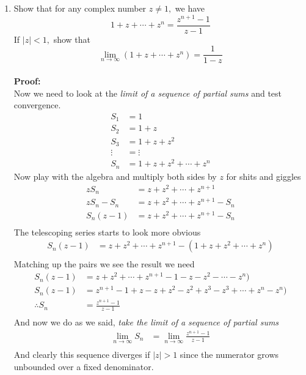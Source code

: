 \begin{enumerate}
	\item Show that for any complex number $z \neq 1,$ we have
	\[ 1 + z + \cdots + z^n = \frac{z^{n + 1} - 1}{z - 1}\]
	If $|z| < 1,$ show that
	\[ \lim_{n \to \infty} (1 + z + \cdots + z^n ) = \frac{1}{1 - z} \] \\
		
	\textbf{Proof:} \\
	Now we need to look at the \textit{limit of a sequence of partial sums} and test convergence. \\

	\begin{align*}
		S_1 &= 1 \\
		S_2 &= 1 + z \\
		S_3 &= 1 + z + z^2 \\
		\vdots &= \vdots \\
		S_n &= 1 + z + z^2 + \cdots + z^n
	\end{align*}
	Now play with the algebra and multiply both sides by $z$ for shits and giggles
	\begin{align*}
		zS_n &= z + z^2 + \cdots + z^{n +1} \\
		zS_n - S_n &= z + z^2 + \cdots + z^{n +1} - S_n \\
		S_n(z - 1) &= z + z^2 + \cdots + z^{n +1} - S_n \\
	\end{align*}
	The telescoping series starts to look more obvious
	\begin{align*}
		S_n(z - 1) &= z + z^2 + \cdots + z^{n +1} - (1 + z + z^2 + \cdots + z^n) \\
	\end{align*}
	Matching up the pairs we see the result we need
	\begin{align*}
		S_n(z - 1) &= z + z^2 + \cdots + z^{n +1} - 1 - z - z^2 - \cdots - z^n) \\
		S_n(z - 1) &= z^{n +1} - 1 + z - z + z^2 - z^2 + z^3 - z^3 + \cdots + z^n - z^n) \\
		\therefore S_n &= \frac{z^{n +1} - 1}{z - 1} \\
	\end{align*}
	And now we do as we said, \textit{take the limit of a sequence of partial sums}
	\begin{align*}
		\lim_{n \to \infty} S_n &= \lim_{n \to \infty} \frac{z^{n +1} - 1}{z - 1} \\
	\end{align*}
	And clearly this sequence diverges if $|z| > 1$ since the numerator grows unbounded over a fixed denominator. \\


\end{enumerate}
